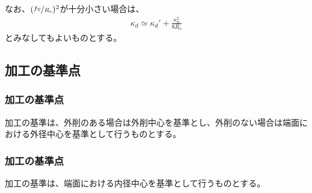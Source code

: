 なお、$(\nicefrac{f_\mathrm T}{R_\mathrm c})^2$が十分小さい場合は、
\begin{align*}
  \kappa_d \simeq \kappa_d'+\frac{\kappa_w^2}{8R_\mathrm o}
\end{align*}
とみなしてもよいものとする。



\clearpage


\subsection{\EndFaceChamfer 加工の基準点}

\subsubsection{\EndFaceOutChamfer 加工の基準点}
\nameEndFaceOutChamfer 加工の基準は、外削のある場合は外削中心を基準とし、外削のない場合は端面における外径中心を基準として行うものとする。

\subsubsection{\EndFaceInChamfer 加工の基準点}
\EndFaceInChamfer 加工の基準は、端面における内径中心を基準として行うものとする。



